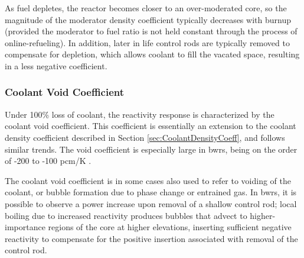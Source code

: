 As fuel depletes, the reactor becomes closer to an over-moderated core, so the magnitude of the moderator density coefficient typically decreases with burnup (provided the moderator to fuel ratio is not held constant through the process of online-refueling). In addition, later in life control rods are typically removed to compensate for depletion, which allows coolant to fill the vacated space, resulting in a less negative coefficient.

\subsubsection{Coolant Void Coefficient}

Under 100\% loss of coolant, the reactivity response is characterized by the coolant void coefficient. This coefficient is essentially an extension to the coolant density coefficient described in Section \ref{sec:CoolantDensityCoeff}, and follows similar trends. The void coefficient is especially large in \glspl{bwr}, being on the order of -200 to -100 pcm/K \cite{duderstadt}. 

The coolant void coefficient is in some cases also used to refer to voiding of the coolant, or bubble formation due to phase change or entrained gas. In \glspl{bwr}, it is possible to observe a power increase upon removal of a shallow control rod; local boiling due to increased reactivity produces bubbles that advect to higher-importance regions of the core at higher elevations, inserting sufficient negative reactivity to compensate for the positive insertion associated with removal of the control rod.